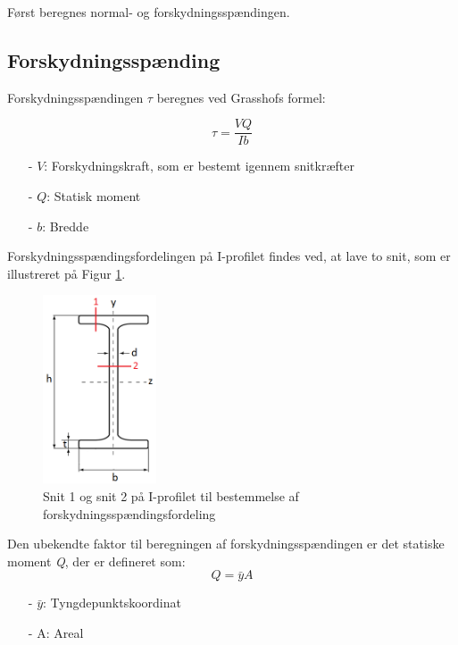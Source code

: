 Først beregnes normal- og forskydningsspændingen. 

\subsection{Forskydningsspænding}
Forskydningsspændingen $\tau$ beregnes ved Grasshofs formel:

\begin{equation}
\tau = \frac{VQ}{Ib}
\end{equation}

\begin{itemize}
	\item[-] $V$: Forskydningskraft, som er bestemt igennem snitkræfter
	\item[-] $Q$: Statisk moment
	\item[-] $b$: Bredde
\end{itemize}

Forskydningsspændingsfordelingen på I-profilet findes ved, at lave to snit, som er illustreret på Figur \ref{fig:snitsnit}. 

\begin{figure}[H]
	\centering
	\includegraphics[width=0.3\textwidth]{billeder/forskydningprofil.png}
	\caption{Snit 1 og snit 2 på I-profilet til bestemmelse af forskydningsspændingsfordeling}
	\label{fig:snitsnit}
\end{figure}

Den ubekendte faktor til beregningen af forskydningsspændingen er det statiske moment \textit{Q}, der er defineret som:
\begin{equation}
Q = \bar{y}A
\end{equation}
\begin{itemize}
	\item[-] $\bar{y}$: Tyngdepunktskoordinat
	\item[-] A: Areal
\end{itemize}

